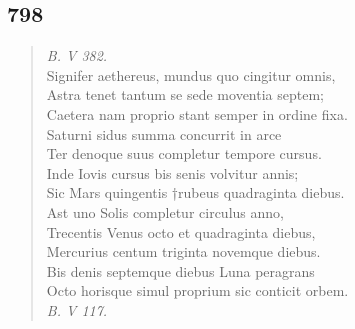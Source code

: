 \documentclass[11pt, a4paper]{report}
\begin{document}
            \subsection*{798}
      \begin{verse}
      \textit{B. V 382.} \\ Signifer aethereus, mundus quo cingitur omnis, \\ Astra tenet tantum se sede moventia septem; \\ Caetera nam proprio stant semper in ordine fixa. \\ Saturni sidus summa concurrit in arce \\ Ter denoque suus completur tempore cursus. \\ Inde Iovis cursus bis senis volvitur annis; \\ Sic Mars quingentis †rubeus quadraginta diebus. \\ Ast uno Solis completur circulus anno, \\ Trecentis Venus octo et quadraginta diebus, \\ Mercurius centum triginta novemque diebus. \\ Bis denis septemque diebus Luna peragrans \\ Octo horisque simul proprium sic conticit orbem. \\ \textit{B. V 117.} \\ 
      \end{verse}
  
\end{document}
